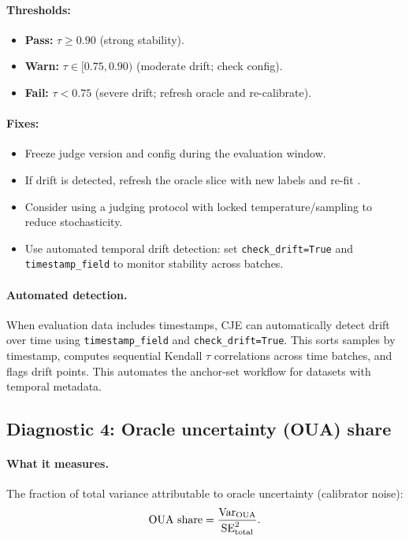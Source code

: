 \paragraph{Thresholds:}
\begin{itemize}
\item \textbf{Pass:} $\tau \ge 0.90$ (strong stability).
\item \textbf{Warn:} $\tau \in [0.75, 0.90)$ (moderate drift; check config).
\item \textbf{Fail:} $\tau < 0.75$ (severe drift; refresh oracle and re-calibrate).
\end{itemize}

\paragraph{Fixes:}
\begin{itemize}
\item Freeze judge version and config during the evaluation window.
\item If drift is detected, refresh the oracle slice with new labels and re-fit \autocal.
\item Consider using a judging protocol with locked temperature/sampling to reduce stochasticity.
\item Use automated temporal drift detection: set \texttt{check\_drift=True} and \texttt{timestamp\_field} to monitor stability across batches.
\end{itemize}

\paragraph{Automated detection.} When evaluation data includes timestamps, CJE can automatically detect drift over time using \texttt{timestamp\_field} and \texttt{check\_drift=True}. This sorts samples by timestamp, computes sequential Kendall $\tau$ correlations across time batches, and flags drift points. This automates the anchor-set workflow for datasets with temporal metadata.

\subsection{Diagnostic 4: Oracle uncertainty (OUA) share}

\paragraph{What it measures.} The fraction of total variance attributable to oracle uncertainty (calibrator noise):
\begin{equation}
\text{OUA share} = \frac{\operatorname{Var}_{\text{OUA}}}{\operatorname{SE}^2_{\text{total}}}.
\end{equation}

